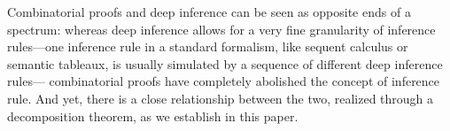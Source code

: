 \documentclass[conference,twosided,10pt]{IEEEtran}
\theoremstyle{definition}
\begin{document}
Combinatorial proofs and deep inference can be seen as opposite ends
of a spectrum: whereas deep inference allows for a very fine
granularity of inference rules---one inference rule in a standard
formalism, like sequent calculus or semantic tableaux, is usually
simulated by a sequence of different deep inference rules---
combinatorial proofs have completely abolished the concept of inference
rule. And yet, there is a close relationship between the two,
realized through a decomposition theorem, as we establish in this
paper.



% 
% 






\end{document}
